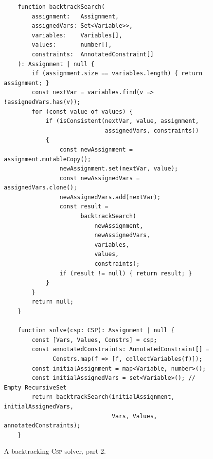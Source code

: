 \begin{figure}[!ht]
\centering
\begin{verbatim}
    function backtrackSearch(
        assignment:   Assignment,
        assignedVars: Set<Variable>>,
        variables:    Variables[],
        values:       number[],
        constraints:  AnnotatedConstraint[]
    ): Assignment | null {   
        if (assignment.size == variables.length) { return assignment; }
        const nextVar = variables.find(v => !assignedVars.has(v));    
        for (const value of values) {
            if (isConsistent(nextVar, value, assignment, 
                             assignedVars, constraints)) 
            {       
                const newAssignment = assignment.mutableCopy();
                newAssignment.set(nextVar, value);    
                const newAssignedVars = assignedVars.clone();
                newAssignedVars.add(nextVar);
                const result = 
                      backtrackSearch(
                          newAssignment, 
                          newAssignedVars, 
                          variables, 
                          values, 
                          constraints);
                if (result != null) { return result; }
            }
        }
        return null;
    }
    
    function solve(csp: CSP): Assignment | null {
        const [Vars, Values, Constrs] = csp;
        const annotatedConstraints: AnnotatedConstraint[] = 
              Constrs.map(f => [f, collectVariables(f)]);
        const initialAssignment = map<Variable, number>();
        const initialAssignedVars = set<Variable>(); // Empty RecursiveSet
        return backtrackSearch(initialAssignment, initialAssignedVars, 
                               Vars, Values, annotatedConstraints);
    }
\end{verbatim}
\vspace*{-0.3cm}
\caption{A backtracking \textsc{Csp} solver, part 2.}
\label{fig:CSP-Solver.ipynb-2}
\end{figure}

